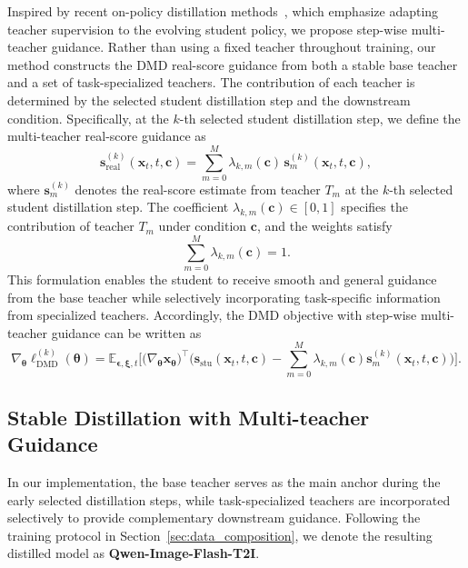 \documentclass{article}
\begin{document}
Inspired by recent on-policy distillation methods~\citep{xiao2026mimo, li2026diffusionopd, fang2026flow}, 
which emphasize adapting teacher supervision to the evolving student policy, we propose step-wise multi-teacher guidance. Rather than using a fixed teacher throughout training, our method constructs the DMD real-score guidance from both a stable base teacher and a set of task-specialized teachers. The contribution of each teacher is determined by the selected student distillation step and the downstream condition. Specifically, at the $k$-th selected student distillation step, we define the multi-teacher real-score guidance as
\begin{equation}
\bm{s}_{\mathrm{real}}^{(k)}(\bm{x}_t,t,\bm{c})
=
\sum_{m=0}^{M}
\lambda_{k,m}(\bm{c})\,
\bm{s}_m^{(k)}(\bm{x}_t,t,\bm{c}),
\label{eq:multi_teacher_score}
\end{equation}
where $\bm{s}_m^{(k)}$ denotes the real-score estimate from teacher $T_m$ at the $k$-th selected student distillation step. 
The coefficient $\lambda_{k,m}(\bm{c}) \in [0,1]$ specifies the contribution of teacher $T_m$ under condition $\bm{c}$, and the weights satisfy
\begin{equation}
\sum_{m=0}^{M}\lambda_{k,m}(\bm{c})=1.
\label{eq:teacher_weight_sum}
\end{equation}
This formulation enables the student to receive smooth and general guidance from the base teacher while selectively incorporating task-specific information from specialized teachers. Accordingly, the DMD objective with step-wise multi-teacher guidance can be written as
\begin{equation}
\nabla_{\bm \theta} \ell_{\text{DMD}}^{(k)}(\bm\theta)
=
\mathbb{E}_{\bm{\epsilon},\bm{\xi},t}
\Big[
\Big(\nabla_{\bm{\theta}} \bm{x}_{\bm{\theta}}\Big)^\intercal
\Big(
\bm s_{\text{stu}}(\bm{x}_t,t,\bm c)
-
\sum_{m=0}^{M}
\lambda_{k,m}(\bm c)
\bm s_m^{(k)}(\bm{x}_t,t,\bm c)
\Big)
\Big].
\label{eq:modified_dmd}
\end{equation}

\subsection{Stable Distillation with Multi-teacher Guidance}

In our implementation, the base teacher serves as the main anchor during the early selected distillation steps, while task-specialized teachers are incorporated selectively to provide complementary downstream guidance. Following the training protocol in Section~\ref{sec:data_composition}, we denote the resulting distilled model as \textbf{Qwen-Image-Flash-T2I}.
\end{document}
